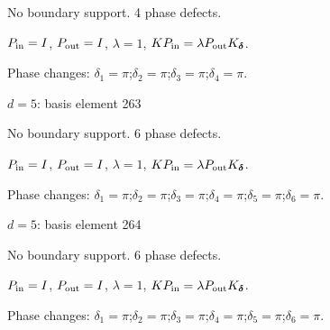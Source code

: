 No boundary support. 4 phase defects.
\begin{center}
\end{center}
\vspace{-1mm}
$P_{\rm in}=I$, \quad $P_{\rm out}=I$, \quad $\lambda=1$, \qquad $K P_{\rm in}=\lambda P_{\rm out}K_{\boldsymbol\delta}$.
\par\smallskip\begin{minipage}{.98\linewidth}\small Phase changes: $\delta_{1}=\pi$;\quad $\delta_{2}=\pi$;\quad $\delta_{3}=\pi$;\quad $\delta_{4}=\pi$.\end{minipage}
\vfill
{\footnotesize\texttt{}}
\newpage
{}
{\Large $d=5$: basis element 263}\par
No boundary support. 6 phase defects.
\begin{center}
\end{center}
\vspace{-1mm}
$P_{\rm in}=I$, \quad $P_{\rm out}=I$, \quad $\lambda=1$, \qquad $K P_{\rm in}=\lambda P_{\rm out}K_{\boldsymbol\delta}$.
\par\smallskip\begin{minipage}{.98\linewidth}\small Phase changes: $\delta_{1}=\pi$;\quad $\delta_{2}=\pi$;\quad $\delta_{3}=\pi$;\quad $\delta_{4}=\pi$;\quad $\delta_{5}=\pi$;\quad $\delta_{6}=\pi$.\end{minipage}
\vfill
{\footnotesize\texttt{}}
\newpage
{}
{\Large $d=5$: basis element 264}\par
No boundary support. 6 phase defects.
\begin{center}
\end{center}
\vspace{-1mm}
$P_{\rm in}=I$, \quad $P_{\rm out}=I$, \quad $\lambda=1$, \qquad $K P_{\rm in}=\lambda P_{\rm out}K_{\boldsymbol\delta}$.
\par\smallskip\begin{minipage}{.98\linewidth}\small Phase changes: $\delta_{1}=\pi$;\quad $\delta_{2}=\pi$;\quad $\delta_{3}=\pi$;\quad $\delta_{4}=\pi$;\quad $\delta_{5}=\pi$;\quad $\delta_{6}=\pi$.\end{minipage}
\vfill
{\footnotesize\texttt{}}
\newpage
